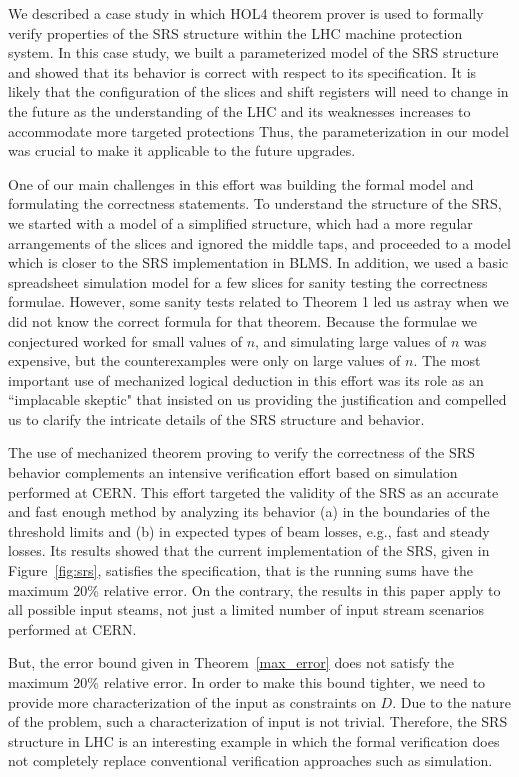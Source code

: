 \documentclass{llncs}
\begin{document}
We described a case study in which HOL4 theorem prover is used to formally verify properties of the SRS structure within the LHC machine protection system.
In this case study, we built a parameterized model of the SRS structure and showed that its behavior is correct with respect to its specification.
It is likely that the configuration of the slices and shift registers will need to change in the future as the understanding of the LHC and its weaknesses increases to accommodate more targeted protections
Thus, the parameterization in our model was crucial to make it applicable to the future upgrades.

One of our main challenges in this effort was building the formal model and formulating the correctness statements.
To understand the structure of the SRS, we started with a model of a simplified structure, which had a more regular arrangements of the slices and ignored the middle taps, and proceeded to a model which is closer to the SRS implementation in BLMS.
In addition, we used a basic spreadsheet simulation model for a few slices for sanity testing the correctness formulae.
However, some sanity tests related to Theorem 1 led us astray when we did not know the correct formula for that theorem.
Because the formulae we conjectured worked for small values of $n$, and simulating large values of $n$ was expensive, but the counterexamples were only on large values of $n$.
The most important use of mechanized logical deduction in this effort was its role as an ``implacable skeptic" that insisted on us providing the justification and compelled us to clarify the intricate details of the SRS structure and behavior.

The use of mechanized theorem proving to verify the correctness of the SRS behavior complements an intensive verification effort based on simulation performed at CERN.
This effort targeted the validity of the SRS as an accurate and fast enough method by analyzing its behavior (a) in the boundaries of the threshold limits and (b) in expected types of beam losses, e.g., fast and steady losses.
Its results showed that the current implementation of the SRS, given in Figure~\ref{fig:srs}, satisfies the specification, that is the running sums have the maximum 20\% relative error.
On the contrary, the results in this paper apply to all possible input steams, not just a limited number of input stream scenarios performed at CERN.

But, the error bound given in Theorem~\ref{max_error} does not satisfy the maximum 20\% relative error.
In order to make this bound tighter, we need to provide more characterization of the input as constraints on $D$.
Due to the nature of the problem, such a characterization of input is not trivial.
Therefore, the SRS structure in LHC is an interesting example in which the formal verification does not completely replace conventional verification approaches such as simulation.
\end{document}
